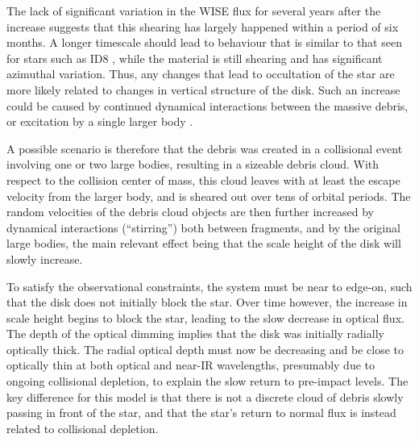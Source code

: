 \documentclass{aa}
\begin{document}
The lack of significant variation in the WISE flux for several years after the increase suggests that this shearing has largely happened within a period of six months.
%
A longer timescale should lead to behaviour that is similar to that seen for stars such as ID8 \citep{2014Sci...345.1032M}, while the material is still shearing and has significant azimuthal variation.
%
Thus, any changes that lead to occultation of the star are more likely related to changes in vertical structure of the disk.
%
Such an increase could be caused by continued dynamical interactions between the massive debris, or excitation by a single larger body \citep[e.g.][]{1992Icar...96..107I}.

A possible scenario is therefore that the debris was created in a collisional event involving one or two large bodies, resulting in a sizeable debris cloud.
%
With respect to the collision center of mass, this cloud leaves with at least the escape velocity from the larger body, and is sheared out over tens of orbital periods.
%
The random velocities of the debris cloud objects are then further increased by dynamical interactions (``stirring'') both between fragments, and by the original large bodies, the main relevant effect being that the scale height of the disk will slowly increase.

To satisfy the observational constraints, the system must be near to edge-on, such that the disk does not initially block the star.
%
Over time however, the increase in scale height begins to block the star, leading to the slow decrease in optical flux.
%
The depth of the optical dimming implies that the disk was initially radially optically thick.
%
The radial optical depth must now be decreasing and be close to optically thin at both optical and near-IR wavelengths, presumably due to ongoing collisional depletion, to explain the slow return to pre-impact levels.
%
The key difference for this model is that there is not a discrete cloud of debris slowly passing in front of the star, and that the star's return to normal flux is instead related to collisional depletion.
%
%
%
\end{document}
